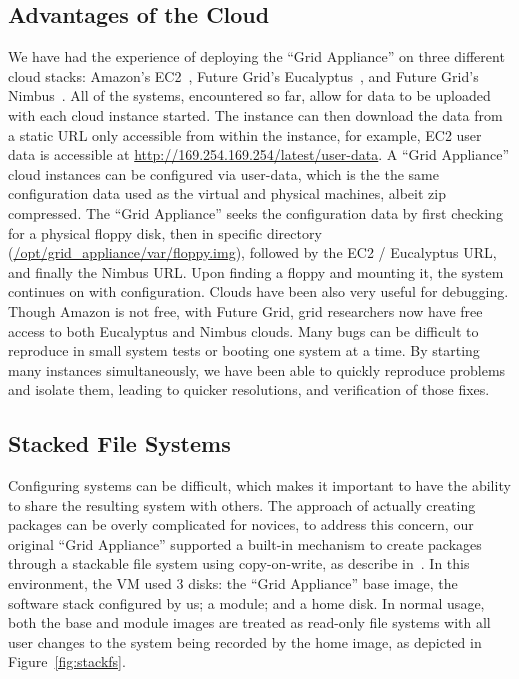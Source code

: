 \documentclass[conference]{IEEEtran}
\begin{document}
\subsection{Advantages of the Cloud}

We have had the experience of deploying the ``Grid Appliance'' on three
different cloud stacks:  Amazon's EC2~\cite{ec2}, Future Grid's
Eucalyptus~\cite{eucalyptus}, and Future Grid's Nimbus~\cite{nimbus}.  All of
the systems, encountered so far, allow for data to be uploaded with each cloud
instance started.  The instance can then download the data from a static URL
only accessible from within the instance, for example, EC2 user data is
accessible at \url{http://169.254.169.254/latest/user-data}. A ``Grid
Appliance'' cloud instances can be configured via user-data, which is the the
same configuration data used as the virtual and physical machines, albeit zip
compressed.  The ``Grid Appliance'' seeks the configuration data by first
checking for a physical floppy disk, then in specific directory
(\url{/opt/grid\_appliance/var/floppy.img}), followed by the EC2 / Eucalyptus
URL, and finally the Nimbus URL.  Upon finding a floppy and mounting it, the
system continues on with configuration.  Clouds have been also very useful for
debugging.  Though Amazon is not free, with Future Grid, grid researchers now
have free access to both Eucalyptus and Nimbus clouds.  Many bugs can be
difficult to reproduce in small system tests or booting one system at a time.
By starting many instances simultaneously, we have been able to quickly
reproduce problems and isolate them, leading to quicker resolutions, and
verification of those fixes.

\subsection{Stacked File Systems}

Configuring systems can be difficult, which makes it important to have the
ability to share the resulting system with others.  The approach of actually
creating packages can be overly complicated for novices, to address this
concern, our original ``Grid Appliance'' supported a built-in mechanism to
create packages through a stackable file system using copy-on-write, as
describe in~\cite{vtdc}.  In this environment, the VM used 3 disks: the ``Grid
Appliance'' base image, the software stack configured by us; a module; and a
home disk.  In normal usage, both the base and module images are treated as
read-only file systems with all user changes to the system being recorded by
the home image, as depicted in Figure~\ref{fig:stackfs}.
\end{document}
